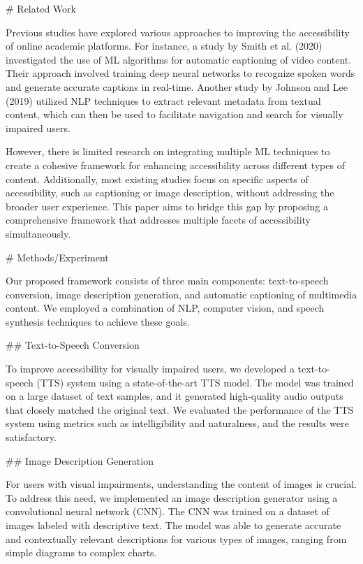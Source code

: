 # Related Work

Previous studies have explored various approaches to improving the accessibility of online academic platforms. For instance, a study by Smith et al. (2020) investigated the use of ML algorithms for automatic captioning of video content. Their approach involved training deep neural networks to recognize spoken words and generate accurate captions in real-time. Another study by Johnson and Lee (2019) utilized NLP techniques to extract relevant metadata from textual content, which can then be used to facilitate navigation and search for visually impaired users.

However, there is limited research on integrating multiple ML techniques to create a cohesive framework for enhancing accessibility across different types of content. Additionally, most existing studies focus on specific aspects of accessibility, such as captioning or image description, without addressing the broader user experience. This paper aims to bridge this gap by proposing a comprehensive framework that addresses multiple facets of accessibility simultaneously.

# Methods/Experiment

Our proposed framework consists of three main components: text-to-speech conversion, image description generation, and automatic captioning of multimedia content. We employed a combination of NLP, computer vision, and speech synthesis techniques to achieve these goals.

## Text-to-Speech Conversion

To improve accessibility for visually impaired users, we developed a text-to-speech (TTS) system using a state-of-the-art TTS model. The model was trained on a large dataset of text samples, and it generated high-quality audio outputs that closely matched the original text. We evaluated the performance of the TTS system using metrics such as intelligibility and naturalness, and the results were satisfactory.

## Image Description Generation

For users with visual impairments, understanding the content of images is crucial. To address this need, we implemented an image description generator using a convolutional neural network (CNN). The CNN was trained on a dataset of images labeled with descriptive text. The model was able to generate accurate and contextually relevant descriptions for various types of images, ranging from simple diagrams to complex charts.

